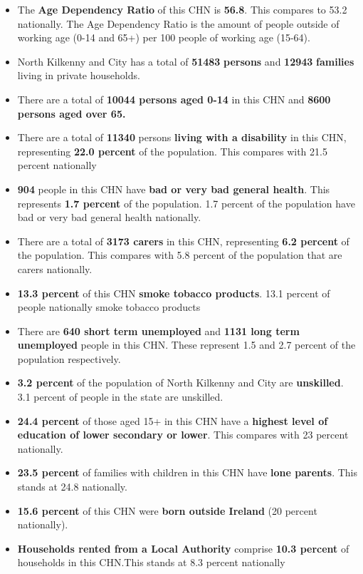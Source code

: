\documentclass{article}
\begin{document}
\begin{itemize}

\item The \textbf{Age Dependency Ratio} of this CHN is  \textbf{56.8}. This compares to 53.2 nationally. The Age Dependency Ratio is the amount of people outside of working age (0-14 and 65+) per 100 people of working age (15-64). 

\item North Kilkenny and City has a total of \textbf{\num{51483}} \textbf{persons} and  \textbf{\num{12943}} \textbf{families} living in private households.

\item There are a total of \textbf{\num{10044} persons aged 0-14} in this CHN and \textbf{\num{8600} persons aged over 65.} 

\item There are a total of \textbf{\num{11340}} persons \textbf{living with a disability} in this CHN, representing \textbf{22.0 percent} of the population. This compares with  21.5 percent nationally

\item \textbf{\num{904}} people in this CHN have \textbf{bad or very bad general health}. This represents \textbf{1.7 percent} of the population. 1.7 percent of the population have bad or very bad general health nationally. 

\item There are a total of \textbf{\num{3173} carers} in this CHN, representing \textbf{6.2 percent} of the population. This compares with 5.8 percent of the population that are carers nationally. 

\item \textbf{13.3 percent} of this CHN \textbf{smoke tobacco products}. 13.1 percent of people nationally smoke tobacco products

\item There are \textbf{\num{640} short term unemployed} and \textbf{\num{1131} long term unemployed} people in this CHN. These represent 1.5 and 2.7 percent of the population respectively.

\item  \textbf{3.2 percent} of the population of North Kilkenny and City are \textbf{unskilled}. 3.1 percent of people in the state are unskilled.

\item \textbf{24.4 percent} of those aged 15+ in this CHN have a \textbf{highest level of education of lower secondary or lower}. This compares with 23 percent nationally. 

\item \textbf{23.5 percent} of families with children in this CHN have \textbf{lone parents}. This stands at 24.8 nationally.

\item \textbf{15.6 percent} of this CHN were \textbf{born outside Ireland} (20 percent nationally).

\item \textbf{Households rented from a Local Authority} comprise \textbf{10.3 percent} of households in this CHN.This stands at 8.3 percent nationally

\end{itemize}
\end{document}
